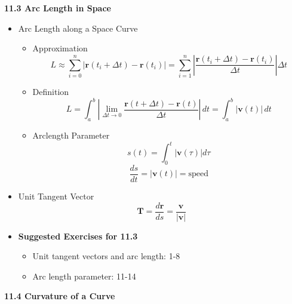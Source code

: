 \documentclass[12pt]{article}
\renewcommand{\vec}[1]{\mathbf{#1}}
\newcommand{\dvar}[1]{\,d{#1}}
\newcommand{\<}{\left<}
\renewcommand{\>}{\right>}
\begin{document}
\newpage

\centerline{\bf 11.3 Arc Length in Space}

  \begin{itemize}
    \item Arc Length along a Space Curve
      \begin{itemize}
        \item Approximation 
          \[L \approx \sum_{i=0}^n |\vec{r}(t_i+\Delta{t})-\vec{r}(t_i)|=\sum_{i=1}^n \left|\frac{\vec{r}(t_i+\Delta{t})-\vec{r}(t_i)}{\Delta{t}}\right|\Delta{t}\]
        \item Definition 
          \[L = \int_a^b \left|\lim_{\Delta{t}\to0}\frac{\vec{r}(t+\Delta{t})-\vec{r}(t)}{\Delta{t}}\right| \dvar{t} = \int_a^b |\vec{v}(t)| \dvar{t}\]
        \item Arclength Parameter 
          \[s(t) = \int_0^t |\vec{v}(\tau)|d\tau\]
          \[\frac{ds}{dt} = |\vec{v}(t)| = \text{speed}\]
      \end{itemize}

    \item Unit Tangent Vector
      \[\vec{T} = \frac{d\vec{r}}{ds} = \frac{\vec{v}}{|\vec{v}|}\]

    \item \textbf{Suggested Exercises for 11.3}
      \begin{itemize}
      \item Unit tangent vectors and arc length: 1-8
      \item Arc length parameter: 11-14
      \end{itemize}
  \end{itemize}

\newpage

\centerline{\bf 11.4 Curvature of a Curve}
\end{document}
